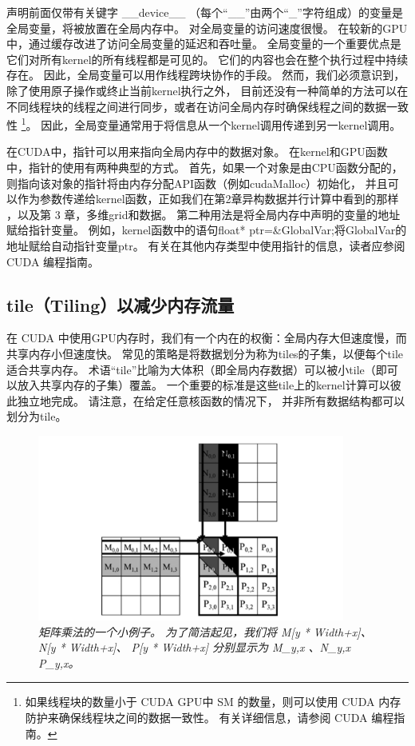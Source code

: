 声明前面仅带有关键字 \_\_device\_\_ （每个“\_\_”由两个“\_”字符组成）的变量是全局变量，将被放置在全局内存中。 
对全局变量的访问速度很慢。 在较新的GPU中，通过缓存改进了访问全局变量的延迟和吞吐量。 
全局变量的一个重要优点是它们对所有kernel的所有线程都是可见的。 它们的内容也会在整个执行过程中持续存在。 
因此，全局变量可以用作线程跨块协作的手段。 然而，我们必须意识到，除了使用原子操作或终止当前kernel执行之外，
目前还没有一种简单的方法可以在不同线程块的线程之间进行同步，或者在访问全局内存时确保线程之间的数据一致性
\footnote{如果线程块的数量小于 CUDA GPU中 SM 的数量，则可以使用 CUDA 内存防护来确保线程块之间的数据一致性。 
有关详细信息，请参阅 CUDA 编程指南。}。 
因此，全局变量通常用于将信息从一个kernel调用传递到另一kernel调用。

在CUDA中，指针可以用来指向全局内存中的数据对象。 在kernel和GPU函数中，指针的使用有两种典型的方式。 
首先，如果一个对象是由CPU函数分配的，则指向该对象的指针将由内存分配API函数（例如cudaMalloc）初始化，
并且可以作为参数传递给kernel函数，正如我们在第2章异构数据并行计算中看到的那样 ，以及第 3 章，多维grid和数据。 
第二种用法是将全局内存中声明的变量的地址赋给指针变量。 
例如，kernel函数中的语句{float* ptr=\&GlobalVar;}将GlobalVar的地址赋给自动指针变量ptr。 
有关在其他内存类型中使用指针的信息，读者应参阅 CUDA 编程指南。

\subsection{tile（Tiling）以减少内存流量}
在 CUDA 中使用GPU内存时，我们有一个内在的权衡：全局内存大但速度慢，而共享内存小但速度快。 
常见的策略是将数据划分为称为tiles的子集，以便每个tile适合共享内存。 
术语“tile”比喻为大体积（即全局内存数据）可以被小tile（即可以放入共享内存的子集）覆盖。 
一个重要的标准是这些tile上的kernel计算可以彼此独立地完成。 请注意，在给定任意核函数的情况下，
并非所有数据结构都可以划分为tile。

\begin{figure}[H]
	\centering
	\includegraphics[width=0.9\textwidth]{figs/F5.5.png}
	\caption{\textit{矩阵乘法的一个小例子。 为了简洁起见，我们将 M[y * Width+x]、N[y * Width+x]、
	P[y * Width+x] 分别显示为 M\_{y,x} 、N\_{y,x} P\_{y,x}。}}
\end{figure}

